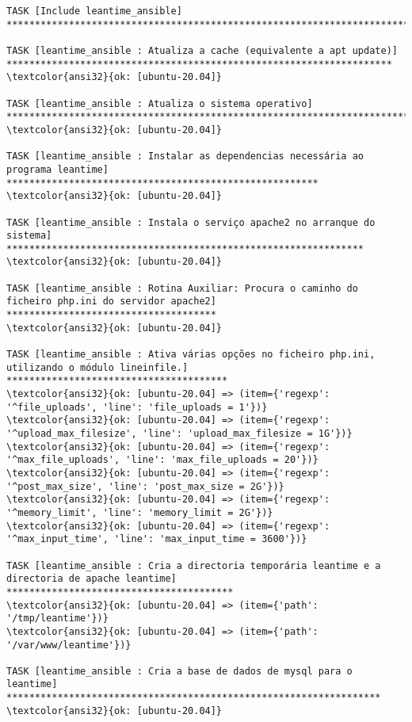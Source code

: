 \documentclass{scrartcl}
\begin{document}
\begin{Verbatim}
TASK [Include leantime_ansible] **********************************************************************************************************

TASK [leantime_ansible : Atualiza a cache (equivalente a apt update)] ********************************************************************
\textcolor{ansi32}{ok: [ubuntu-20.04]}

TASK [leantime_ansible : Atualiza o sistema operativo] ***********************************************************************************
\textcolor{ansi32}{ok: [ubuntu-20.04]}

TASK [leantime_ansible : Instalar as dependencias necessária ao programa leantime] *******************************************************
\textcolor{ansi32}{ok: [ubuntu-20.04]}

TASK [leantime_ansible : Instala o serviço apache2 no arranque do sistema] ***************************************************************
\textcolor{ansi32}{ok: [ubuntu-20.04]}

TASK [leantime_ansible : Rotina Auxiliar: Procura o caminho do ficheiro php.ini do servidor apache2] *************************************
\textcolor{ansi32}{ok: [ubuntu-20.04]}

TASK [leantime_ansible : Ativa várias opções no ficheiro php.ini, utilizando o módulo lineinfile.] ***************************************
\textcolor{ansi32}{ok: [ubuntu-20.04] => (item={'regexp': '^file_uploads', 'line': 'file_uploads = 1'})}
\textcolor{ansi32}{ok: [ubuntu-20.04] => (item={'regexp': '^upload_max_filesize', 'line': 'upload_max_filesize = 1G'})}
\textcolor{ansi32}{ok: [ubuntu-20.04] => (item={'regexp': '^max_file_uploads', 'line': 'max_file_uploads = 20'})}
\textcolor{ansi32}{ok: [ubuntu-20.04] => (item={'regexp': '^post_max_size', 'line': 'post_max_size = 2G'})}
\textcolor{ansi32}{ok: [ubuntu-20.04] => (item={'regexp': '^memory_limit', 'line': 'memory_limit = 2G'})}
\textcolor{ansi32}{ok: [ubuntu-20.04] => (item={'regexp': '^max_input_time', 'line': 'max_input_time = 3600'})}

TASK [leantime_ansible : Cria a directoria temporária leantime e a directoria de apache leantime] ****************************************
\textcolor{ansi32}{ok: [ubuntu-20.04] => (item={'path': '/tmp/leantime'})}
\textcolor{ansi32}{ok: [ubuntu-20.04] => (item={'path': '/var/www/leantime'})}

TASK [leantime_ansible : Cria a base de dados de mysql para o leantime] ******************************************************************
\textcolor{ansi32}{ok: [ubuntu-20.04]}


\end{Verbatim}
\end{document}
